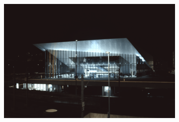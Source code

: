 \begin{figure}
\begin{subfigure}[t]{.24\textwidth}
      \includegraphics[width=\linewidth]{figures/color-vgg-tv-relative-swisstech.png}
    \end{subfigure}



\end{figure}
